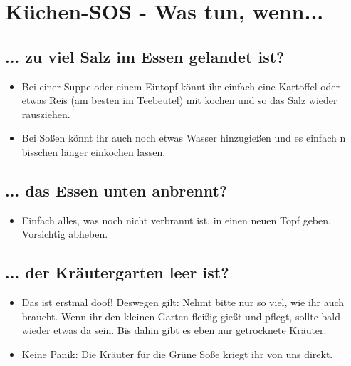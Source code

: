 \newpage
\section{Küchen-SOS - Was tun, wenn...}
\subsection*{... zu viel Salz im Essen gelandet ist?} %
\label{sub:_zu_viel_salz_im_essen_gelandet_ist}
\begin{itemize}
    \item Bei einer Suppe oder einem Eintopf könnt ihr einfach eine Kartoffel oder etwas Reis (am besten im Teebeutel) mit kochen und so das Salz wieder rausziehen. 
    \item Bei Soßen könnt ihr auch noch etwas Wasser hinzugießen und es einfach n bisschen länger einkochen lassen.
\end{itemize}

\subsection*{... das Essen unten anbrennt?} %
\label{sub:_das_essen_unten_anbrennt}
\begin{itemize}
    \item Einfach alles, was noch nicht verbrannt ist, in einen neuen Topf geben. Vorsichtig abheben.
\end{itemize}

\subsection*{... der Kräutergarten leer ist?} %
\label{sub:_der_krautergarten_leer_ist}
\begin{itemize}
    \item Das ist erstmal doof! Deswegen gilt: Nehmt bitte nur so viel, wie ihr auch braucht. Wenn ihr den kleinen Garten fleißig gießt und pflegt, sollte bald wieder etwas da sein. Bis dahin gibt es eben nur getrocknete Kräuter.
    \item Keine Panik: Die Kräuter für die Grüne Soße kriegt ihr von uns direkt.
\end{itemize}

